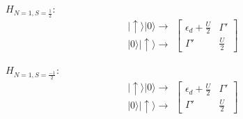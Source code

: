 \begin{multicols}{2}

$H_{N=1,S=\frac{1}{2}}:$
\[
\begin{array}{c}
\vert\uparrow\rangle\vert0\rangle\rightarrow\\
\vert0\rangle\vert\uparrow\rangle\rightarrow
\end{array}\left[\begin{array}{cc}
\epsilon_{d}+\frac{U}{2} & \Gamma'\\
\Gamma' & \frac{U}{2}
\end{array}\right]
\]


$H_{N=1,S=\frac{-1}{2}}:$
\[
\begin{array}{c}
\vert\uparrow\rangle\vert0\rangle\rightarrow\\
\vert0\rangle\vert\uparrow\rangle\rightarrow
\end{array}\left[\begin{array}{cc}
\epsilon_{d}+\frac{U}{2} & \Gamma'\\
\Gamma' & \frac{U}{2}
\end{array}\right]
\]


\end{multicols}

